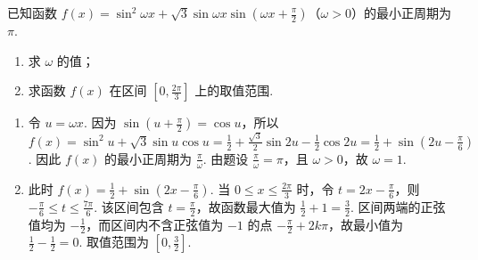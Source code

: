\begin{problem}
已知函数 \( f(x) = \sin^2 \omega x + \sqrt{3}\sin \omega x\sin \left(\omega x + \frac{\pi}{2}\right) \)（\(\omega > 0\)）的最小正周期为 \( \pi \).

\begin{enumerate}
\item 求 \(\omega\) 的值；
\item 求函数 \( f(x) \) 在区间 \( \left[0, \frac{2\pi}{3}\right] \) 上的取值范围.
\end{enumerate}

\begin{solution}
\begin{enumerate}
\item 令 \(u=\omega x\). 因为 \(\sin\left(u+\frac\pi2\right)=\cos u\)，所以
\(\displaystyle f(x)=\sin^2u+\sqrt3\sin u\cos u=\frac12+\frac{\sqrt3}{2}\sin2u-\frac12\cos2u=\frac12+\sin\left(2u-\frac\pi6\right)\).
因此 \(f(x)\) 的最小正周期为 \(\frac\pi\omega\). 由题设 \(\frac\pi\omega=\pi\)，且 \(\omega>0\)，故 \(\omega=1\).
\item 此时 \(f(x)=\frac12+\sin\left(2x-\frac\pi6\right)\). 当 \(0\leqslant x\leqslant\frac{2\pi}{3}\) 时，令 \(t=2x-\frac\pi6\)，则 \(-\frac\pi6\leqslant t\leqslant\frac{7\pi}{6}\). 该区间包含 \(t=\frac\pi2\)，故函数最大值为 \(\frac12+1=\frac32\). 区间两端的正弦值均为 \(-\frac12\)，而区间内不含正弦值为 \(-1\) 的点 \(-\frac\pi2+2k\pi\)，故最小值为 \(\frac12-\frac12=0\). 取值范围为 \(\left[0,\frac32\right]\).
\end{enumerate}
\end{solution}
\end{problem}

